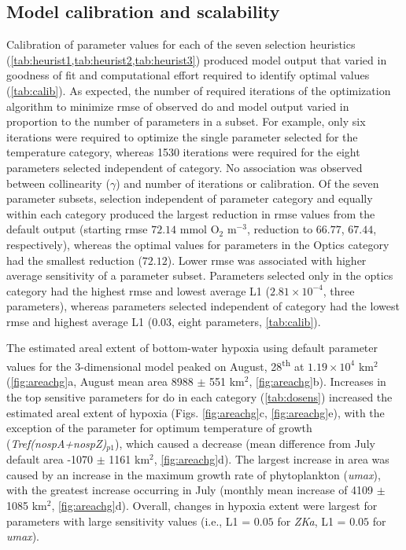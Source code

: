\documentclass[review]{elsarticle}\usepackage[]{graphicx}\usepackage[]{color}
\begin{document}
\subsection{Model calibration and scalability}



Calibration of parameter values for each of the seven selection heuristics (\cref{tab:heurist1,tab:heurist2,tab:heurist3})  produced model output that varied in goodness of fit and computational effort required to identify optimal values (\cref{tab:calib}).  As expected, the number of required iterations of the optimization algorithm to minimize \ac{rmse} of observed \ac{do} and model output varied in proportion to the number of parameters in a subset.  For example, only six iterations were required to optimize the single parameter selected for the temperature category, whereas 1530 iterations were required for the eight parameters selected independent of category.  No association was observed between collinearity ($\gamma$) and number of iterations or calibration.  Of the seven parameter subsets, selection independent of parameter category and equally within each category produced the largest reduction in \ac{rmse} values from the default output (starting \ac{rmse} $72.14$ mmol O$_2$ m$^{-3}$, reduction to $66.77$, $67.44$, respectively), whereas the optimal values for parameters in the Optics category had the smallest reduction ($72.12$).  Lower \ac{rmse} was associated with higher average sensitivity of a parameter subset.  Parameters selected only in the optics category had the highest \ac{rmse} and lowest average L1 ($2.81\times 10^{-4}$, three parameters), whereas parameters selected independent of category had the lowest \ac{rmse} and highest average L1 ($0.03$, eight parameters, \cref{tab:calib}). 



The estimated areal extent of bottom-water hypoxia using default parameter values for the 3-dimensional model peaked on August, 28\textsuperscript{th} at $1.19\times 10^{4}$ km$^2$ (\cref{fig:areachg}a, August mean area 8988 $\pm$ 551 km$^2$, \cref{fig:areachg}b). Increases in the top sensitive parameters for \ac{do} in each category (\cref{tab:dosens}) increased the estimated areal extent of hypoxia (Figs. \ref{fig:areachg}c, \ref{fig:areachg}e), with the exception of the parameter for optimum temperature of growth (\textit{Tref(nospA+nospZ)$_{p1}$}), which caused a decrease (mean difference from July default area -1070 $\pm$ 1161 km$^2$, \cref{fig:areachg}d).  The largest increase in area was caused by an increase in the maximum growth rate of phytoplankton (\textit{umax}), with the greatest increase occurring in July (monthly mean increase of 4109 $\pm$ 1085 km$^2$, \cref{fig:areachg}d).  Overall, changes in hypoxia extent were largest for parameters with large sensitivity values (i.e., L1 = $0.05$ for \textit{ZKa}, L1 = $0.05$ for \textit{umax}).
\end{document}
